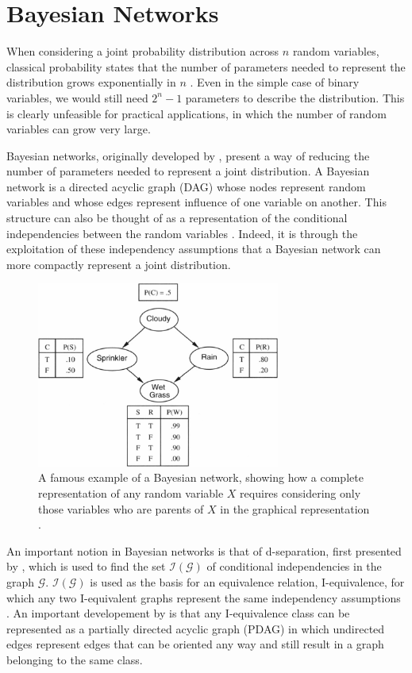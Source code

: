 \documentclass [11pt]{article}
\begin{document}
\section{Bayesian Networks}\label{BayesianNetworks}
When considering a joint probability distribution across $n$ random variables, classical probability states that the number of parameters needed to represent the distribution grows exponentially in $n$ \citep{koller09}. Even in the simple case of binary variables, we would still need $2^n -1$ parameters to describe the distribution. This is clearly unfeasible for practical applications, in which the number of random variables can grow very large. 

Bayesian networks, originally developed by \citet{pearl88}, present a way of reducing the number of parameters needed to represent a joint distribution. A Bayesian network is a directed acyclic graph (DAG) whose nodes represent random variables and whose edges represent influence of one variable on another. This structure can also be thought of as a representation of the conditional independencies between the random variables \citep{koller09}. Indeed, it is through the exploitation of these independency assumptions that a Bayesian network can more compactly represent a joint distribution.
\begin{figure}[H]\label{fig:sprinkler}
\centering
\caption{A famous example of a Bayesian network, showing how a complete representation of any random variable $X$ requires considering only those variables who are parents of $X$ in the graphical representation \citep{norvig94}.}
\includegraphics[width=8cm]{sprinkler.jpg}
\end{figure}
An important notion in Bayesian networks is that of d-separation, first presented by \citet{pearl86}, which is used to find the set $\mathcal{I}(\mathcal{G})$ of conditional independencies in the graph $\mathcal{G}$. $\mathcal{I}(\mathcal{G})$ is used as the basis for an equivalence relation, I-equivalence, for which any two I-equivalent graphs represent the same independency assumptions \citep{verma91}. An important developement by \citet{pearl86} is that any I-equivalence class can be represented as a partially directed acyclic graph (PDAG) in which undirected edges represent edges that can be oriented any way and still result in a graph belonging to the same class.
\end{document}
